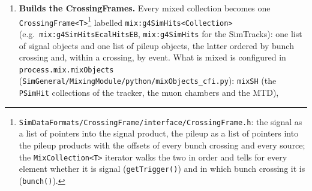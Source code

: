 \documentclass[11pt,a4paper]{article}
\newcommand{\code}[1]{\texttt{#1}}
\newcommand{\bx}{\ensuremath{\mathrm{bx}}}
\newcommand{\ns}{\,\mathrm{ns}}
\begin{document}
\begin{enumerate}
\begin{lstlisting}[style=cpp]
  int timeOffset = bcr * bunchSpace;
  EncodedEventId id(bcr, evtNr);
  for (auto& item : simvertices) { item.setEventId(id); item.setTof(item.position().t() + timeOffset); }
}
void doTheOffset(int bunchSpace, int bcr, std::vector<PCaloHit>& calohits, unsigned int evtNr, int vertexOffset, bool wrap) {
  int timeOffset = bcr * bunchSpace;
  EncodedEventId id(bcr, evtNr);
  for (auto& item : calohits) { item.setEventId(id); item.setTime(item.time() + timeOffset); }
}
\end{lstlisting}
  The signal keeps \code{EncodedEventId(0, 0)} and its times. For example the third library event read for
  $\bx=-1$ is stamped \code{EncodedEventId(-1, 3)}: its \code{bunchCrossing()} returns $-1$, its
  \code{event()} returns 3, and all its vertex and hit times are $25\ns$ earlier than Geant4 left them. The
  Geant4 track ids of the pileup events are
  \emph{not} renumbered: a track id is unique only within one event, so from the DIGI step on a simulated
  object is identified by the pair (event id, track id). This is what the \code{DigiSimLink}s, the
  \code{TrackingParticle}s and the \code{SimHitAnalyzer} use: track id 42 exists in the signal and, in
  general, in every one of the 18 pileup events, and only the pair (\code{EncodedEventId}, 42) names one
  particle. For the \code{PSimHit}s the \code{wrap} option
  (\code{WrapLongTimes} parameter of the module, off by default and here) folds the time of flight of very
  late hits back into one bunch crossing; so a pileup tracker hit of $\bx=-1$ simply has its time of flight
  minus 25\,ns.
\item \textbf{Builds the CrossingFrames.} Every mixed collection becomes one
  \code{CrossingFrame<T>}\footnote{\code{SimDataFormats/CrossingFrame/interface/CrossingFrame.h}: the
  signal as a list of pointers into the signal product, the pileup as a list of pointers into the pileup
  products with the offsets of every bunch crossing and every source; the \code{MixCollection<T>} iterator
  walks the two in order and tells for every element whether it is signal (\code{getTrigger()}) and in which
  bunch crossing it is (\code{bunch()}).} labelled \code{mix:g4SimHits<Collection>} (e.g.\
  \code{mix:g4SimHitsEcalHitsEB}, \code{mix:g4SimHits} for the SimTracks): one list of signal objects and one
  list of pileup objects, the latter ordered by bunch crossing and, within a crossing, by event. What is
  mixed is configured in \code{process.mix.mixObjects} (\code{SimGeneral/MixingModule/python/mixObjects\_cfi.py}):
  \code{mixSH} (the \code{PSimHit} collections of the tracker, the muon chambers and the MTD),

\end{enumerate}
\end{document}
